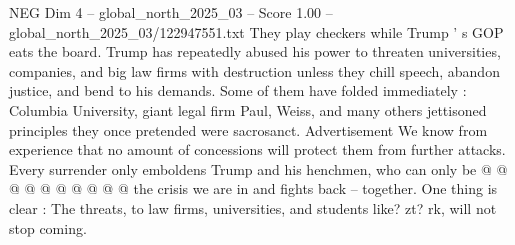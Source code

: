 \begin{textsample}{NEG Dim 4 – global\_north\_2025\_03 – Score 1.00 – global\_north\_2025\_03/122947551.txt}
They play checkers while Trump ' s GOP eats the board.
Trump has repeatedly abused his power to threaten universities, companies, and big law firms with destruction unless they chill speech, abandon justice, and bend to his demands.
Some of them have folded immediately : Columbia University, giant legal firm Paul, Weiss, and many others jettisoned principles they once pretended were sacrosanct.
Advertisement We know from experience that no amount of concessions will protect them from further attacks.
Every surrender only emboldens Trump and his henchmen, who can only be @ @ @ @ @ @ @ @ @ @ the crisis we are in and fights back -- together.
One thing is clear : The threats, to law firms, universities, and students like? zt? rk, will not stop coming.

\end{textsample}
